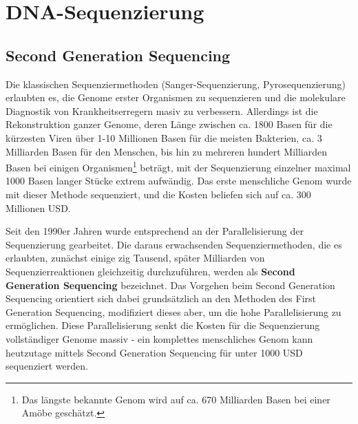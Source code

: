 \section{DNA-Sequenzierung}







\subsection{Second Generation Sequencing}

Die klassischen Sequenziermethoden (Sanger-Sequenzierung, Pyrosequenzierung) erlaubten es, die Genome erster Organismen zu sequenzieren und die molekulare Diagnostik von Krankheitserregern masiv zu verbessern. Allerdings ist die Rekonstruktion ganzer Genome, deren Länge zwischen ca. 1800 Basen für die kürzesten Viren über 1-10 Millionen Basen für die meisten Bakterien, ca. 3 Milliarden Basen für den Menschen, bis hin zu mehreren hundert Milliarden Basen bei einigen Organismen\footnote{Das längste bekannte Genom wird auf ca. 670 Milliarden Basen bei einer Amöbe geschätzt.} beträgt, mit der Sequenzierung einzelner maximal 1000 Basen langer Stücke extrem aufwändig. Das erste menschliche Genom wurde mit dieser Methode sequenziert, und die Kosten beliefen sich auf ca. 300 Millionen USD. 

Seit den 1990er Jahren wurde entsprechend an der Parallelisierung der Sequenzierung gearbeitet. Die daraus erwachsenden Sequenziermethoden, die es erlaubten, zunächst einige zig Tausend, später Milliarden von Sequenzierreaktionen gleichzeitig durchzuführen, werden als \textbf{Second Generation Sequencing} bezeichnet. Das Vorgehen beim Second Generation Sequencing orientiert sich dabei grundsätzlich an den Methoden des First Generation Sequencing, modifiziert dieses aber, um die hohe Parallelisierung zu ermöglichen. Diese Parallelisierung senkt die Kosten für die Sequenzierung vollständiger Genome massiv - ein komplettes menschliches Genom kann heutzutage mittels Second Generation Sequencing für unter 1000 USD sequenziert werden. 

